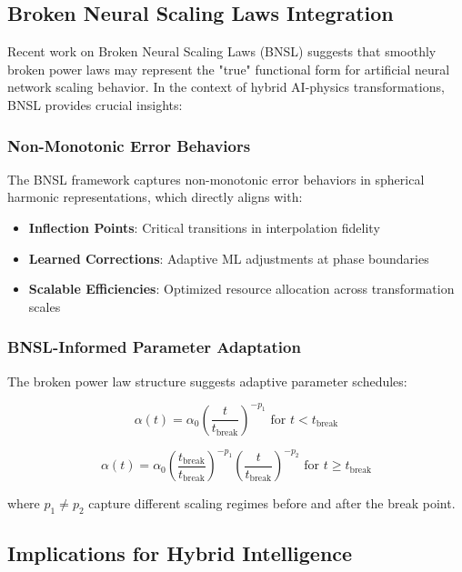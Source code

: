 \subsection{Broken Neural Scaling Laws Integration}

Recent work on Broken Neural Scaling Laws (BNSL) \cite{hoffmann2022training} suggests that smoothly broken power laws may represent the "true" functional form for artificial neural network scaling behavior. In the context of hybrid AI-physics transformations, BNSL provides crucial insights:

\subsubsection{Non-Monotonic Error Behaviors}

The BNSL framework captures non-monotonic error behaviors in spherical harmonic representations, which directly aligns with:
\begin{itemize}
    \item \textbf{Inflection Points}: Critical transitions in interpolation fidelity
    \item \textbf{Learned Corrections}: Adaptive ML adjustments at phase boundaries
    \item \textbf{Scalable Efficiencies}: Optimized resource allocation across transformation scales
\end{itemize}

\subsubsection{BNSL-Informed Parameter Adaptation}

The broken power law structure suggests adaptive parameter schedules:

\begin{equation}
\alpha(t) = \alpha_0 \left(\frac{t}{t_{\text{break}}}\right)^{-p_1} \text{ for } t < t_{\text{break}}
\end{equation}

\begin{equation}
\alpha(t) = \alpha_0 \left(\frac{t_{\text{break}}}{t_{\text{break}}}\right)^{-p_1} \left(\frac{t}{t_{\text{break}}}\right)^{-p_2} \text{ for } t \geq t_{\text{break}}
\end{equation}

where $p_1 \neq p_2$ capture different scaling regimes before and after the break point.

\subsection{Implications for Hybrid Intelligence}


